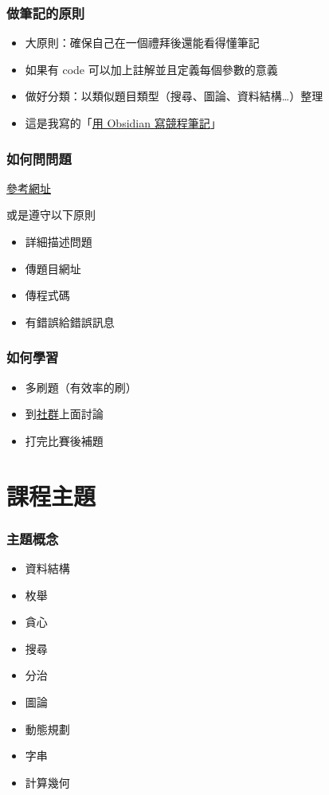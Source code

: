 \documentclass{beamer}
\begin{document}
\begin{frame}
    \frametitle{做筆記的原則}
    \begin{itemize}
        \item 大原則：確保自己在一個禮拜後還能看得懂筆記
        \item 如果有 code 可以加上註解並且定義每個參數的意義
        \item 做好分類：以類似題目類型（搜尋、圖論、資料結構…）整理
        \vspace{0.5cm}
        \item 這是我寫的「\href{https://hackmd.io/@temmie950807/rJL9TfXpj}{用 Obsidian 寫競程筆記}」
    \end{itemize}
\end{frame}

\begin{frame}
    \frametitle{如何問問題}
    \href{https://github.com/ryanhanwu/How-To-Ask-Questions-The-Smart-Way}{參考網址}
    
    \vspace{0.5cm}
    或是遵守以下原則
    \begin{itemize}
        \item 詳細描述問題
        \item 傳題目網址
        \item 傳程式碼
        \item 有錯誤給錯誤訊息
    \end{itemize}
\end{frame}

\begin{frame}
    \frametitle{如何學習}
    \begin{itemize}
        \item 多刷題（有效率的刷）
        \item 到\href{https://discord.gg/cisc}{社群}上面討論
        \item 打完比賽後補題
    \end{itemize}
\end{frame}

\section{課程主題}

\begin{frame}
    \frametitle{主題概念}
    \begin{itemize}
        \item 資料結構
        \item 枚舉
        \item 貪心
        \item 搜尋
        \item 分治
        \item 圖論
        \item 動態規劃
        \item 字串
        \item 計算幾何
    \end{itemize}

    \vspace{0.5cm}
\end{frame}
\end{document}
